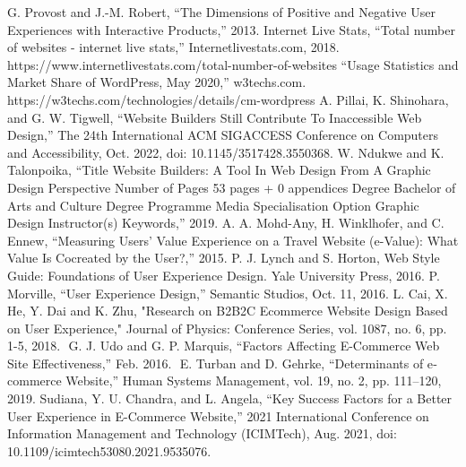 \documentclass[article]{IEEEtran}
\begin{document}
    \begin{thebibliography}{9}
            G. Provost and J.-M. Robert, “The Dimensions of Positive and Negative User Experiences with Interactive Products,” 2013.
            Internet Live Stats, “Total number of websites - internet live stats,” Internetlivestats.com, 2018. https://www.internetlivestats.com/total-number-of-websites
            “Usage Statistics and Market Share of WordPress, May 2020,” w3techs.com. https://w3techs.com/technologies/details/cm-wordpress
            A. Pillai, K. Shinohara, and G. W. Tigwell, “Website Builders Still Contribute To Inaccessible Web Design,” The 24th International ACM SIGACCESS Conference on Computers and Accessibility, Oct. 2022, doi: 10.1145/3517428.3550368.
            W. Ndukwe and K. Talonpoika, “Title Website Builders: A Tool In Web Design From A Graphic Design Perspective Number of Pages 53 pages + 0 appendices Degree Bachelor of Arts and Culture Degree Programme Media Specialisation Option Graphic Design Instructor(s) Keywords,” 2019. 
            A. A. Mohd-Any, H. Winklhofer, and C. Ennew, “Measuring Users’ Value Experience on a Travel Website (e-Value): What Value Is Cocreated by the User?,” 2015.
            P. J. Lynch and S. Horton, Web Style Guide: Foundations of User Experience Design. Yale University Press, 2016.
            P. Morville, “User Experience Design,” Semantic Studios, Oct. 11, 2016.
            L. Cai, X. He, Y. Dai and K. Zhu, "Research on B2B2C Ecommerce Website Design Based on User Experience," Journal of
            Physics: Conference Series, vol. 1087, no. 6, pp. 1-5, 2018.
‌
                G. J. Udo and G. P. Marquis, “Factors Affecting E-Commerce Web Site Effectiveness,” Feb. 2016.
‌           
                E. Turban and D. Gehrke, “Determinants of e‐commerce Website,” Human Systems Management, vol. 19, no. 2, pp. 111–120, 2019.
                Sudiana, Y. U. Chandra, and L. Angela, “Key Success Factors for a Better User Experience in E-Commerce Website,” 2021 International Conference on Information Management and Technology (ICIMTech), Aug. 2021, doi: 10.1109/icimtech53080.2021.9535076.
                

\end{thebibliography}
\end{document}
